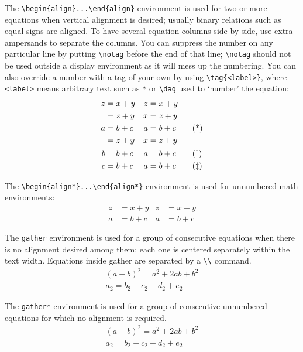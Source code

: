 \documentclass[numbers,webpdf,imaiai]{ima-authoring-template}%
\theoremstyle{thmstyleone}%
\theoremstyle{thmstyletwo}%
\theoremstyle{thmstylethree}%
\numberwithin{equation}{section}
\begin{document}
The \verb+\begin{align}...\end{align}+ environment is used for two or more equations when vertical alignment is desired;
usually binary relations such as equal signs are aligned. To have several equation columns side-by-side, use extra ampersands
to separate the columns. You can suppress the number on any particular line by putting \verb+\notag+ before the end of that line;
\verb+\notag+ should not be used outside a display environment as it will mess up the numbering. You can also override a number
with a tag of your own by using \verb+\tag{<label>}+, where \verb+<label>+ means arbitrary text such as \verb+*+ or \verb+\dag+
used to `number' the equation:
\begin{align}
z &= x+y &z &= x+y \\
  &= z+y &x &= z+y \nonumber\\
a &= b+c &a &= b+c \tag{*} \\
  &= z+y &x &= z+y \notag\\
b &= b+c &a &= b+c \tag{\dag} \\
c &= b+c &a &= b+c \tag{\ddag}
\end{align}

The \verb+\begin{align*}...\end{align*}+ environment is used for unnumbered math environments:
\begin{align*}
z &= x+y &z &= x+y \\
a &= b+c &a &= b+c
\end{align*}

The \verb+gather+ environment is used for a group of consecutive equations when there
is no alignment desired among them; each one is centered separately within
the text width. Equations inside gather are separated by a \verb+\\+ command.
\begin{gather}
(a+b)^{2} = a^{2} + 2ab + b^{2} \nonumber \\
a_{2} = b_{2} + c_{2} - d_{2} + e_{2}
\end{gather}

The \verb+gather*+ environment is used for a group of consecutive unnumbered equations for which no alignment is required.
\begin{gather*}
(a+b)^{2} = a^{2} + 2ab + b^{2} \\
a_{2} = b_{2} + c_{2} - d_{2} + e_{2}
\end{gather*}
\end{document}
